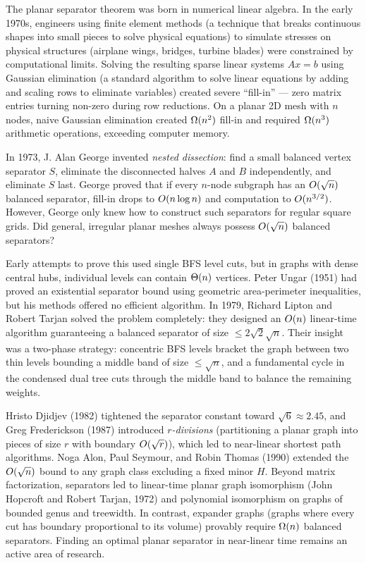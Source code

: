 \begin{historybox}
The planar separator theorem was born in numerical linear algebra. In the early 1970s,
engineers using finite element methods (a technique that breaks continuous shapes into small pieces to solve physical equations) to simulate stresses on physical structures
(airplane wings, bridges, turbine blades) were constrained by computational limits.
Solving the resulting sparse linear systems $A x = b$ using Gaussian elimination (a standard algorithm to solve linear equations by adding and scaling rows to eliminate variables) created
severe ``fill-in'' --- zero matrix entries turning non-zero during row reductions.
On a planar 2D mesh with $n$ nodes, naive Gaussian elimination created $\Omega(n^2)$ fill-in
and required $\Omega(n^3)$ arithmetic operations, exceeding computer memory.

In 1973, J. Alan George invented \emph{nested dissection}: find a small balanced vertex
separator $S$, eliminate the disconnected halves $A$ and $B$ independently, and eliminate
$S$ last. George proved that if every $n$-node subgraph has an $O(\sqrt{n})$ balanced
separator, fill-in drops to $O(n\log n)$ and computation to $O(n^{3/2})$.
However, George only knew how to construct such separators for regular square grids.
Did general, irregular planar meshes always possess $O(\sqrt{n})$ balanced separators?

Early attempts to prove this used single BFS level cuts, but in graphs with dense central
hubs, individual levels can contain $\Theta(n)$ vertices. Peter Ungar (1951) had proved
an existential separator bound using geometric area-perimeter inequalities, but his
methods offered no efficient algorithm. In 1979, Richard Lipton and Robert Tarjan
solved the problem completely: they designed an $O(n)$ linear-time algorithm guaranteeing
a balanced separator of size $\le 2\sqrt{2}\sqrt{n}$. Their insight was a two-phase
strategy: concentric BFS levels bracket the graph between two thin levels bounding a
middle band of size $\le \sqrt{n}$, and a fundamental cycle in the condensed dual tree
cuts through the middle band to balance the remaining weights.

Hristo Djidjev (1982) tightened the separator constant toward $\sqrt{6}\approx 2.45$, and
Greg Frederickson (1987) introduced \emph{$r$-divisions} (partitioning a planar graph into
pieces of size $r$ with boundary $O(\sqrt{r})$), which led to near-linear shortest path
algorithms. Noga Alon, Paul Seymour, and Robin Thomas (1990) extended the $O(\sqrt{n})$
bound to any graph class excluding a fixed minor $H$. Beyond matrix factorization,
separators led to linear-time planar graph isomorphism (John Hopcroft and Robert Tarjan,
1972) and polynomial isomorphism on graphs of bounded genus and treewidth. In contrast,
expander graphs (graphs where every cut has boundary proportional to its volume) provably
require $\Omega(n)$ balanced separators. Finding an optimal planar separator in near-linear
time remains an active area of research.
\end{historybox}

